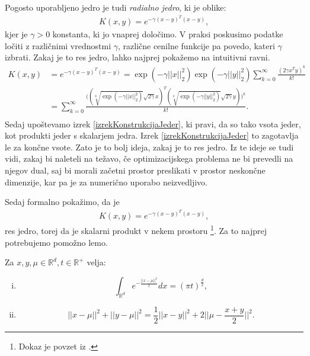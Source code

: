 \documentclass[mat1]{fmfdelo}
\newcommand{\R}{\mathbb R}
\begin{document}
Pogosto uporabljeno jedro je tudi \emph{radialno jedro}, ki je oblike: 
\begin{align*}
K(x, y) = e^{-\gamma(x - y)^T(x-y)},
\end{align*}
kjer je $\gamma > 0$ konstanta, ki jo vnaprej določimo. V praksi poskusimo podatke ločiti z različnimi vrednostmi $\gamma$, različne cenilne funkcije pa povedo, kateri $\gamma$ izbrati.  Zakaj je to res jedro, lahko najprej pokažemo na intuitivni ravni. 
\begin{align*}
K(x, y) &= e^{-\gamma(x - y)^T(x-y)} = \exp(-\gamma ||x||_2^2)\exp(-\gamma ||y||_2^2)\sum_{k=0}^{\infty}\frac{(2\gamma x^Ty)^k}{k!} \\
&= \sum_{k=0}^{\infty}\frac{\big(	(\sqrt[k]{\exp(-\gamma ||x||_2^2)}\sqrt{2\gamma}x)^T(\sqrt[k]{\exp(-\gamma ||y||_2^2)}\sqrt{2\gamma}y)\big)^k}{k!}. \\
\end{align*}
Sedaj upoštevamo izrek \ref{izrekKonstrukcijaJeder}, ki pravi, da so tako vsota jeder, kot produkti jeder s skalarjem jedra. Izrek \ref{izrekKonstrukcijaJeder} to zagotavlja le za končne vsote. Zato je to bolj ideja, zakaj je to res jedro. Iz te ideje se tudi vidi, zakaj bi naleteli na težavo, če optimizacijskega problema ne bi prevedli na njegov dual, saj bi morali začetni prostor preslikati v prostor neskončne dimenzije, kar pa je za numerično uporabo neizvedljivo. 

Sedaj formalno pokažimo, da je  
\begin{align*}
K(x, y) = e^{-\gamma(x - y)^T(x-y)},
\end{align*}
res jedro, torej da je skalarni produkt v nekem prostoru \footnote{Dokaz je povzet iz \cite{RKHS}.}. Za to najprej potrebujemo pomožno lemo. 
\begin{lema}
	\label{lemaRacun}
	Za $x, y, \mu \in \R^d, t\in \R^+ $ velja:
	\begin{enumerate}[(i)]
		\item 
		$$\int_{\R^d}e^{-\frac{||x-\mu||^2}{t}}dx = (\pi t)^{\frac{d}{2}},$$
		\item 
		$$ ||x-\mu||^2 + ||y-\mu||^2 = \frac{1}{2} ||x-y||^2 + 2 \Big|\Big|\mu - \frac{x + y}{2} \Big|\Big|^2  .$$
	\end{enumerate}
	
\end{lema}
\end{document}

